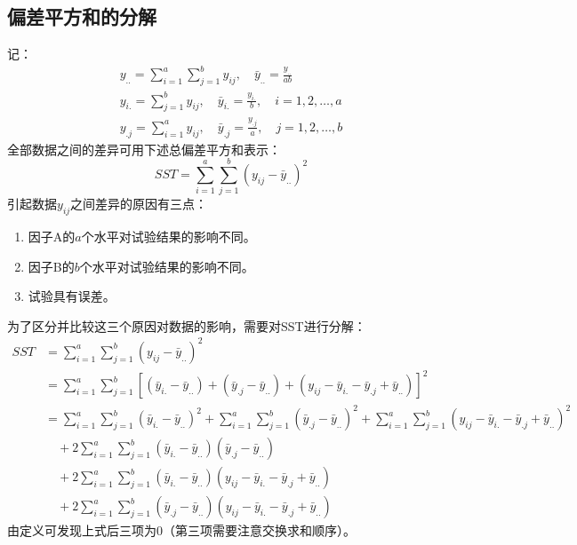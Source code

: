 \subsection{偏差平方和的分解}
记：
\begin{gather*}
	y_{..}=\sum_{i=1}^a\sum_{j=1}^by_{ij},\quad
	\bar{y}_{..}=\frac{y_{..}}{ab} \\
	y_{i.}=\sum_{j=1}^by_{ij},\quad
	\bar{y}_{i.}=\frac{y_{i.}}{b},\quad i=1,2,\dots,a \\
	y_{.j}=\sum_{i=1}^ay_{ij},\quad
	\bar{y}_{.j}=\frac{y_{.j}}{a},\quad j=1,2,\dots,b 
\end{gather*}
全部数据之间的差异可用下述总偏差平方和表示：
\begin{equation*}
	SST=\sum_{i=1}^a\sum_{j=1}^b(y_{ij}-\bar{y}_{..})^2
\end{equation*}
引起数据$y_{ij}$之间差异的原因有三点：
\begin{enumerate}
	\item 因子A的$a$个水平对试验结果的影响不同。
	\item 因子B的$b$个水平对试验结果的影响不同。
	\item 试验具有误差。
\end{enumerate}
为了区分并比较这三个原因对数据的影响，需要对SST进行分解：
\begin{align*}
	SST
	&=\sum_{i=1}^a\sum_{j=1}^b(y_{ij}-\bar{y}_{..})^2 \\
	&=\sum_{i=1}^a\sum_{j=1}^b\left[(\bar{y}_{i.}-\bar{y}_{..})+(\bar{y}_{.j}-\bar{y}_{..})+(y_{ij}-\bar{y}_{i.}-\bar{y}_{.j}+\bar{y}_{..})\right]^2 \\
	&=\sum_{i=1}^a\sum_{j=1}^b(\bar{y}_{i.}-\bar{y}_{..})^2+\sum_{i=1}^a\sum_{j=1}^b(\bar{y}_{.j}-\bar{y}_{..})^2+\sum_{i=1}^a\sum_{j=1}^b(y_{ij}-\bar{y}_{i.}-\bar{y}_{.j}+\bar{y}_{..})^2 \\
	&\quad+2\sum_{i=1}^a\sum_{j=1}^b(\bar{y}_{i.}-\bar{y}_{..})(\bar{y}_{.j}-\bar{y}_{..}) \\
	&\quad+2\sum_{i=1}^a\sum_{j=1}^b(\bar{y}_{i.}-\bar{y}_{..})(y_{ij}-\bar{y}_{i.}-\bar{y}_{.j}+\bar{y}_{..}) \\
	&\quad+2\sum_{i=1}^a\sum_{j=1}^b(\bar{y}_{.j}-\bar{y}_{..})(y_{ij}-\bar{y}_{i.}-\bar{y}_{.j}+\bar{y}_{..})
\end{align*}
由定义可发现上式后三项为$0$（第三项需要注意交换求和顺序）。
